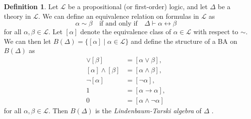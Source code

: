 \documentclass{article}
\theoremstyle{definition}
\newtheorem{definition}[theorem]{Definition}
\theoremstyle{remark}
\begin{document}
\begin{definition} \label{def:algebra_from_logic}
  Let $\mathcal{L}$ be a propositional (or first-order) logic, and let
  $\Delta$ be a theory in $\mathcal{L}$. We can define an equivalence
  relation on formulas in $\mathcal{L}$ as
  \[
    \alpha \sim \beta \quad \text{if and only if} \quad \Delta \vdash \alpha
    \leftrightarrow \beta
  \]
  for all $\alpha, \beta \in \mathcal{L}$. Let $[\alpha]$ denote the equivalence
  class of $\alpha \in \mathcal{L}$ with respect to $\sim$. We can then let
  $B(\Delta) = \{ [\alpha] \mid \alpha \in \mathcal{L} \}$ and define the
  structure of a BA on $B(\Delta)$ as
  \begin{align*}
    [\alpha] \lor [\beta] &= [\alpha \lor \beta], \\
    [\alpha] \land [\beta] &= [\alpha \land \beta], \\
    \neg[\alpha] &= [\neg\alpha], \\
    1 &= [\alpha \to \alpha], \\
    0 &= [\alpha \land \neg\alpha]
  \end{align*}
  for all $\alpha, \beta \in \mathcal{L}$. Then $B(\Delta)$ is the
  \emph{Lindenbaum-Tarski algebra} of $\Delta$
  \cite{koppelberg1989handbook,tarski1983logic}.
\end{definition}
\end{document}
